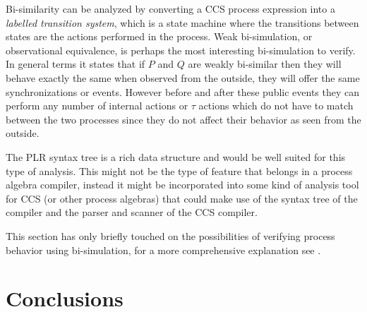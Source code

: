 	Bi-similarity can be analyzed by converting a CCS process expression into a 
	\textit{labelled transition system}, which is a state machine where the 
	transitions between states are the actions performed in the process. Weak 
	bi-simulation, or observational equivalence, is perhaps the most interesting 
	bi-simulation to verify. In general terms it states that if $P$ and $Q$ are 
	weakly bi-similar then they will behave exactly the same when observed from 
	the outside, they will offer the same synchronizations or events. However 
	before and after these public events they can perform any number of internal 
	actions or $\tau$ actions which do not have to match between the two 
	processes since they do not affect their behavior as seen from the outside. 
	
	The PLR syntax tree is a rich data structure and would be well suited for 
	this type of analysis. This might not be the type of feature that belongs in 
	a process algebra compiler, instead it might be incorporated into some kind 
	of analysis tool for CCS (or other process algebras) that could make use of 
	the syntax tree of the compiler and the parser and scanner of the CCS 
	compiler. 
	
	This section has only briefly touched on the possibilities of verifying 
	process behavior using bi-simulation, for a more comprehensive explanation 
	see \cite{reactive}.
	
\section{Conclusions}
